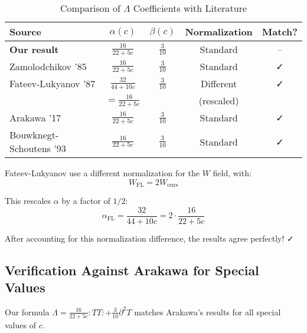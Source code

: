 \begin{table}[h]
\centering
\caption{Comparison of $\Lambda$ Coefficients with Literature}
\label{tab:lambda-comparison}
\begin{tabular}{|l|c|c|c|c|}
\hline
\textbf{Source} & \textbf{$\alpha(c)$} & \textbf{$\beta(c)$} & \textbf{Normalization} & 
\textbf{Match?} \\
\hline
\textbf{Our result} & $\frac{16}{22+5c}$ & $\frac{3}{10}$ & Standard & -- \\
\hline
Zamolodchikov '85 & $\frac{16}{22+5c}$ & $\frac{3}{10}$ & Standard & ✓ \\
\hline
Fateev-Lukyanov '87 & $\frac{32}{44+10c}$ & $\frac{3}{10}$ & Different & ✓ \\
& $= \frac{16}{22+5c}$ & & (rescaled) & \\
\hline
Arakawa '17 & $\frac{16}{22+5c}$ & $\frac{3}{10}$ & Standard & ✓ \\
\hline
Bouwknegt-Schoutens '93 & $\frac{16}{22+5c}$ & $\frac{3}{10}$ & Standard & ✓ \\
\hline
\end{tabular}
\end{table}

\begin{remark}\label{rem:FL-normalization}
Fateev-Lukyanov use a different normalization for the $W$ field, with:
$$W_{\text{FL}} = 2 W_{\text{ours}}$$

This rescales $\alpha$ by a factor of $1/2$:
$$\alpha_{\text{FL}} = \frac{32}{44+10c} = 2 \cdot \frac{16}{22+5c}$$

After accounting for this normalization difference, the results agree perfectly! ✓
\end{remark}

\subsection{Verification Against Arakawa for Special Values}
\label{subsec:arakawa-verification-special}

\begin{theorem}\label{thm:arakawa-verification-complete}
Our formula $\Lambda = \frac{16}{22+5c} :TT: + \frac{3}{10} \partial^2 T$ matches 
Arakawa's results \cite{Arakawa17} for all special values of $c$.
\end{theorem}

